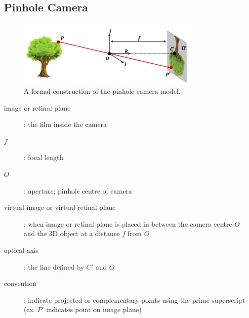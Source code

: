 \documentclass[letterpaper,12pt]{article}
\begin{document}
\subsection{Pinhole Camera}
\begin{figure}[h!]
 \centering
 \includegraphics[width=0.8\textwidth]{images/pinhole_camera.png}
 \caption{A formal construction of the pinhole camera model.}
\end{figure}
\begin{description}
 \item[image or retinal plane]: the film inside the camera
 \item[$f$]: focal length
 \item[$O$]: aperture; pinhole centre of camera
 \item[virtual image or virtual retinal plane]: when image or retinal plane is placed in between the camera centre $O$ and the 3D object at a distance $f$ from $O$
 \item[optical axis]: the line defined by $C'$ and $O$
 \item[convention]: indicate projected or complementary points using the prime superscript (ex. $P'$ indicates point on image plane)
\end{description}
\end{document}
